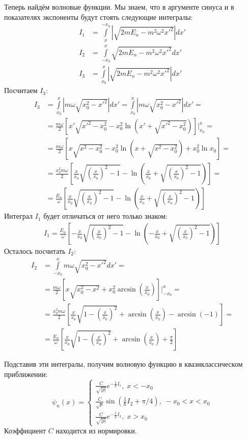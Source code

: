 Теперь найдём волновые функции. Мы знаем, что в аргументе синуса и в показателях экспоненты будут стоять следующие интегралы:
\begin{align*}
I_1 &= \int\limits_{x}^{-x_0}|\sqrt{2mE_n - m^2\omega^2x'^2}|dx'\\
I_2 &= \int\limits_{-x_0}^{x}\sqrt{2mE_n - m^2\omega^2x'^2}dx'\\
I_3 &= \int\limits_{x_0}^{x}|\sqrt{2mE_n - m^2\omega^2x'^2}|dx'
\end{align*}
Посчитаем $I_3$:
\begin{align*}
    I_3 &= \int\limits_{x_0}^{x}|m\omega\sqrt{x_0^2 - x'^2}|dx' = \int\limits_{x_0}^{x}|m\omega\sqrt{x_0^2 - x'^2}|dx' = \\
    &= \frac{m\omega}{2}\left[x'\sqrt{x'^2 - x_0^2} - x_0^2\ln (x' + \sqrt{x'^2 - x_0^2} )\right]\Bigg|_{x_0}^{x} = \\ 
    &= \frac{m\omega}{2}\left[x\sqrt{x^2 - x_0^2} - x_0^2\ln (x + \sqrt{x^2 - x_0^2} ) + x_0^2\ln x_0 \right]= \\
    &= \frac{x_0^2 m\omega}{2} \left[\frac{x}{x_0}\sqrt{\left(\frac{x}{x_0}\right)^2 - 1} - \ln (\frac{x}{x_0} + \sqrt{\left(\frac{x}{x_0}\right)^2 - 1} )\right] = \\
    &=\frac{E_n} {\omega}\left[\frac{x}{x_0}\sqrt{\left(\frac{x}{x_0}\right)^2 - 1} - \ln (\frac{x}{x_0} + \sqrt{ \left(\frac{x}{x_0}\right)^2 - 1} )\right]
\end{align*}
Интеграл $I_1$ будет отличаться от него только знаком:
\begin{align*}
    I_1 = \frac{E_n}{\omega}\left[-\frac{x}{x_0}\sqrt{\left(\frac{x}{x_0}\right)^2 - 1} - \ln (-\frac{x}{x_0} + \sqrt{ \left(\frac{x}{x_0}\right)^2 - 1} )\right]
\end{align*}
Осталось посчитать $I_2$:
\begin{align*}
    I_2 &= \int\limits_{-x_0}^{x}m\omega\sqrt{x_0^2 - x'^2}dx' = \\
    & = \frac{m\omega}{2}\left[x\sqrt{x_0^2- x^2} + x_0^2\arcsin\left(\frac{x}{x_0}\right)\right]\Bigg|_{-x_0}^{x} = \\
    & = \frac{x_0^2 m\omega}{2}\left[\frac{x}{x_0}\sqrt{1 - \left(\frac{x}{x_0}\right)^2 } + \arcsin\left(\frac{x}{x_0}\right) - \arcsin(-1)\right] = \\
    & = \frac{E_n}{\omega}\left[\frac{x}{x_0}\sqrt{1 - \left(\frac{x}{x_0}\right)^2} + \arcsin(\frac{x}{x_0}) + \frac{\pi}{2}\right]
\end{align*}


Подставив эти интегралы, получим волновую функцию в квазиклассическом приближении:
\begin{equation*}
\psi_n(x) = 
\begin{cases}
    \frac{C}{\sqrt{|p|}}e^{-\frac{1}{\hbar}I_1},\; x < -x_0\\
    \frac{C}{\sqrt{p}}\sin(\frac{1}{\hbar}I_2 + \pi/4),\; -x_0 < x < x_0\\
    \frac{C}{\sqrt{|p|}}e^{-\frac{1}{\hbar}I_3},\; x > x_0
\end{cases}
\end{equation*}
Коэффициент $C$ находится из нормировки.

